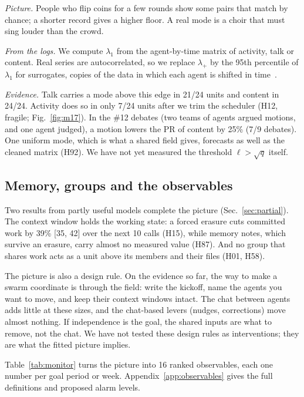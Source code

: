 \emph{Picture.} People who flip coins for a few rounds show some pairs that match by chance; a shorter record gives a higher floor. A real mode is a choir that must sing louder than the crowd.

\emph{From the logs.} We compute $\lambda_1$ from the agent-by-time matrix of activity, talk or content. Real series are autocorrelated, so we replace $\lambda_+$ by the 95th percentile of $\lambda_1$ for surrogates, copies of the data in which each agent is shifted in time~\cite{laloux1999}.

\emph{Evidence.} Talk carries a mode above this edge in 21/24 units and content in 24/24. Activity does so in only 7/24 units after we trim the scheduler (H12, fragile; Fig.~\ref{fig:m17}). In the \#12 debates (two teams of agents argued motions, and one agent judged), a motion lowers the PR of content by 25\% (7/9 debates). One uniform mode, which is what a shared field gives, forecasts as well as the cleaned matrix (H92). We have not yet measured the threshold $\ell>\sqrt q$ itself.

\subsection{Memory, groups and the observables}\label{sec:observables}

Two results from partly useful models complete the picture (Sec.~\ref{sec:partial}). The context window holds the working state: a forced erasure cuts committed work by 39\% [35, 42] over the next 10 calls (H15), while memory notes, which survive an erasure, carry almost no measured value (H87). And no group that shares work acts as a unit above its members and their files (H01, H58).

The picture is also a design rule. On the evidence so far, the way to make a swarm coordinate is through the field: write the kickoff, name the agents you want to move, and keep their context windows intact. The chat between agents adds little at these sizes, and the chat-based levers (nudges, corrections) move almost nothing. If independence is the goal, the shared inputs are what to remove, not the chat. We have not tested these design rules as interventions; they are what the fitted picture implies.

Table~\ref{tab:monitor} turns the picture into 16 ranked observables, each one number per goal period or week. Appendix~\ref{app:observables} gives the full definitions and proposed alarm levels.

